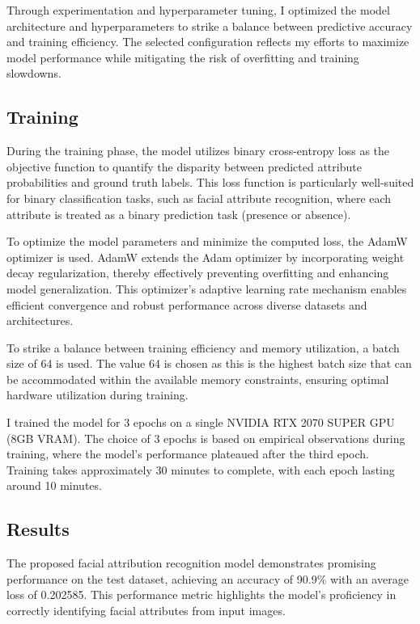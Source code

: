 \documentclass[a4paper,oneside]{article}
\begin{document}
Through experimentation and hyperparameter tuning, I optimized the model architecture and hyperparameters to strike a balance between predictive accuracy and training efficiency.
The selected configuration reflects my efforts to maximize model performance while mitigating the risk of overfitting and training slowdowns.

\subsection{Training}
\label{sec:subsection_training}

During the training phase, the model utilizes binary cross-entropy loss as the objective function to quantify the disparity between predicted attribute probabilities and ground truth labels.
This loss function is particularly well-suited for binary classification tasks, such as facial attribute recognition, where each attribute is treated as a binary prediction task (presence or absence).

To optimize the model parameters and minimize the computed loss, the AdamW optimizer \citet{DBLP:journals/corr/abs-1711-05101} is used.
AdamW extends the Adam optimizer by incorporating weight decay regularization, thereby effectively preventing overfitting and enhancing model generalization.
This optimizer's adaptive learning rate mechanism enables efficient convergence and robust performance across diverse datasets and architectures.

To strike a balance between training efficiency and memory utilization, a batch size of 64 is used.
The value 64 is chosen as this is the highest batch size that can be accommodated within the available memory constraints, ensuring optimal hardware utilization during training.

I trained the model for 3 epochs on a single NVIDIA RTX 2070 SUPER GPU (8GB VRAM).
The choice of 3 epochs is based on empirical observations during training, where the model's performance plateaued after the third epoch.
Training takes approximately 30 minutes to complete, with each epoch lasting around 10 minutes.

\subsection{Results}
\label{sec:subsection_results}

The proposed facial attribution recognition model demonstrates promising performance on the test dataset, achieving an accuracy of 90.9\% with an average loss of 0.202585.
This performance metric highlights the model's proficiency in correctly identifying facial attributes from input images.
\end{document}
